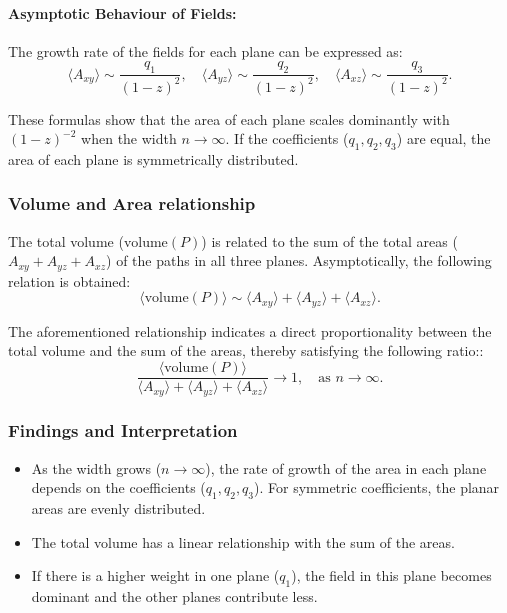 \documentclass{article}
\begin{document}
\paragraph{Asymptotic Behaviour of Fields:}
The growth rate of the fields for each plane can be expressed as:
\begin{equation}
    \langle A_{xy} \rangle \sim \frac{q_1}{(1 - z)^2}, \quad 
    \langle A_{yz} \rangle \sim \frac{q_2}{(1 - z)^2}, \quad 
    \langle A_{xz} \rangle \sim \frac{q_3}{(1 - z)^2}.
\end{equation}

These formulas show that the area of each plane scales dominantly with $(1 - z)^{-2}$ when the width $n \to \infty$. If the coefficients ($q_1, q_2, q_3$) are equal, the area of each plane is symmetrically distributed.

\subsubsection{Volume and Area relationship}

The total volume ($\text{volume}(P)$) is related to the sum of the total areas ($A_{xy} + A_{yz} + A_{xz}$) of the paths in all three planes. Asymptotically, the following relation is obtained:
\begin{equation}
    \langle \text{volume}(P) \rangle \sim \langle A_{xy} \rangle + \langle A_{yz} \rangle + \langle A_{xz} \rangle.
\end{equation}

The aforementioned relationship indicates a direct proportionality between the total volume and the sum of the areas, thereby satisfying the following ratio::
\begin{equation}
    \frac{\langle \text{volume}(P) \rangle}{\langle A_{xy} \rangle + \langle A_{yz} \rangle + \langle A_{xz} \rangle} \to 1, \quad \text{as } n \to \infty.
\end{equation}


\subsubsection{Findings and Interpretation}

\begin{itemize}
    \item As the width grows ($n \to \infty$), the rate of growth of the area in each plane depends on the coefficients ($q_1, q_2, q_3$). For symmetric coefficients, the planar areas are evenly distributed.
    \item The total volume has a linear relationship with the sum of the areas.
    \item If there is a higher weight in one plane ($q_1$), the field in this plane becomes dominant and the other planes contribute less.
\end{itemize}
\end{document}
